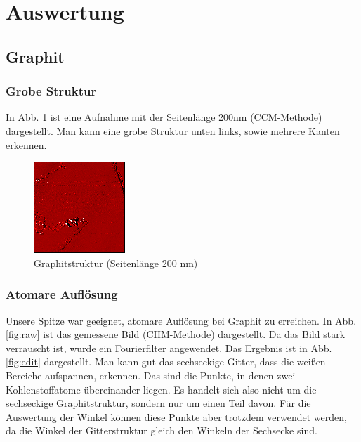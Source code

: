 \newpage

\section{Auswertung}
\subsection{Graphit}
\subsubsection{Grobe Struktur}

In Abb. \ref{fig:raw_big} ist eine Aufnahme mit der Seitenlänge 200nm (CCM-Methode) dargestellt. Man kann eine grobe Struktur unten links, sowie mehrere Kanten erkennen.

\begin{figure}[h]
    \centering
    \includegraphics{data/graphit/raw_big.png}
    \caption{Graphitstruktur (Seitenlänge 200 nm)}
    \label{fig:raw_big}
\end{figure}

\subsubsection{Atomare Auflösung}
Unsere Spitze war geeignet, atomare Auflösung bei Graphit zu erreichen. In Abb. \ref{fig:raw} ist das gemessene Bild (CHM-Methode) dargestellt. Da das Bild stark verrauscht ist, wurde ein Fourierfilter angewendet. Das Ergebnis ist in Abb. \ref{fig:edit} dargestellt. Man kann gut das sechseckige Gitter, dass die weißen Bereiche aufspannen, erkennen. Das sind die Punkte, in denen zwei Kohlenstoffatome übereinander liegen. Es handelt sich also nicht um die sechseckige Graphitstruktur, sondern nur um einen Teil davon. Für die Auswertung der Winkel können diese Punkte aber trotzdem verwendet werden, da die Winkel der Gitterstruktur gleich den Winkeln der Sechsecke sind.\\

